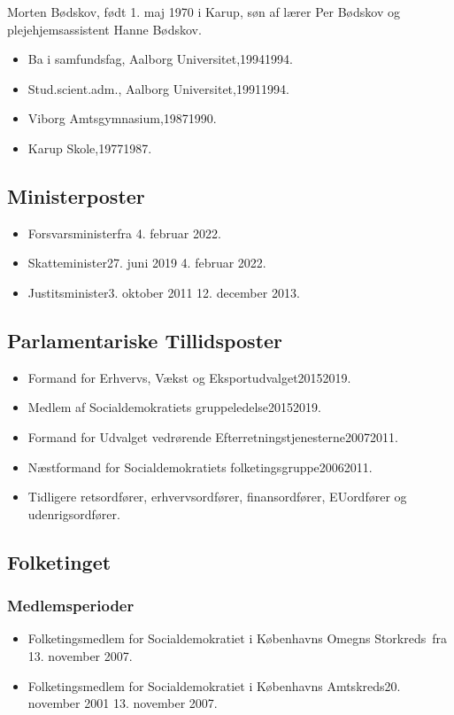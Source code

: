 \documentclass[11pt, a4paper]{awesome-cv}
\begin{document}
\makecvheader[R]
\makelettertitle
\begin{cvletter}
Morten Bødskov, født 1. maj 1970 i Karup, søn af lærer Per Bødskov og plejehjemsassistent Hanne Bødskov.

\begin{itemize}
\item Ba i samfundsfag, Aalborg Universitet,19941994.
\item Stud.scient.adm., Aalborg Universitet,19911994.
\item Viborg Amtsgymnasium,19871990.
\item Karup Skole,19771987.
\end{itemize}
\subsection*{Ministerposter}
\begin{itemize}
\item Forsvarsministerfra 4. februar 2022.
\item Skatteminister27. juni 2019  4. februar 2022.
\item Justitsminister3. oktober 2011  12. december 2013.
\end{itemize}
\subsection*{Parlamentariske Tillidsposter}
\begin{itemize}
\item Formand for Erhvervs, Vækst og Eksportudvalget20152019.
\item Medlem af Socialdemokratiets gruppeledelse20152019.
\item Formand for Udvalget vedrørende Efterretningstjenesterne20072011.
\item Næstformand for Socialdemokratiets folketingsgruppe20062011.
\item Tidligere retsordfører, erhvervsordfører, finansordfører, EUordfører og udenrigsordfører.
\end{itemize}
\subsection*{Folketinget}
\subsubsection*{Medlemsperioder}
\begin{itemize}
\item Folketingsmedlem for Socialdemokratiet i Københavns Omegns Storkreds fra 13. november 2007.
\item Folketingsmedlem for Socialdemokratiet i Københavns Amtskreds20. november 2001  13. november 2007.
\end{itemize}

\end{cvletter}
\end{document}

